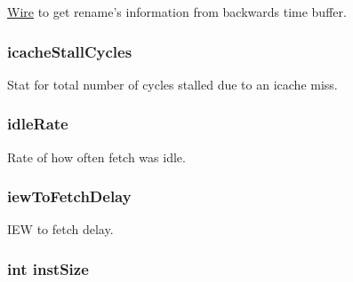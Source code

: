 \label{classDefaultFetch_ae99c54a9c8f1e218b86afcee348c54fc}
\hyperlink{classWire}{Wire} to get rename's information from backwards time buffer. \hypertarget{classDefaultFetch_a2b9328bdb1a6898bfae824981cd64311}{
\subsubsection[{icacheStallCycles}]{ {\bf icacheStallCycles}}}
\label{classDefaultFetch_a2b9328bdb1a6898bfae824981cd64311}
Stat for total number of cycles stalled due to an icache miss. \hypertarget{classDefaultFetch_a4b942e4ec6b8c1d29a1c96e901ea71dd}{
\subsubsection[{idleRate}]{ {\bf idleRate}}}
\label{classDefaultFetch_a4b942e4ec6b8c1d29a1c96e901ea71dd}
Rate of how often fetch was idle. \hypertarget{classDefaultFetch_a986e734c1e66dc0be1723ade04d06d4b}{
\subsubsection[{iewToFetchDelay}]{ {\bf iewToFetchDelay}}}
\label{classDefaultFetch_a986e734c1e66dc0be1723ade04d06d4b}
IEW to fetch delay. \hypertarget{classDefaultFetch_a494a9a986bc62c946604f9e9047ad237}{
\subsubsection[{instSize}]{\setlength{\rightskip}{0pt plus 5cm}int {\bf instSize}}}
